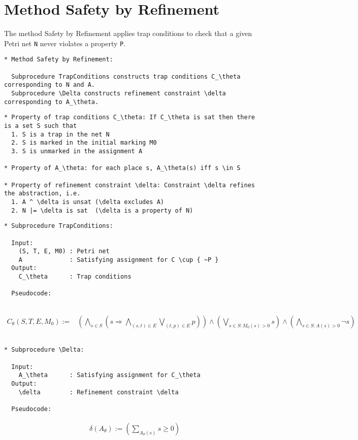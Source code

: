 \documentclass{llncs}
\begin{document}
\newpage

\section{Method Safety by Refinement}

The method Safety by Refinement applies trap conditions to check that a given Petri net \verb=N= never violates a property \verb=P=.

\begin{verbatim}
* Method Safety by Refinement:

  Subprocedure TrapConditions constructs trap conditions C_\theta corresponding to N and A.
  Subprocedure \Delta constructs refinement constraint \delta corresponding to A_\theta.
\end{verbatim}





\begin{verbatim}
* Property of trap conditions C_\theta: If C_\theta is sat then there is a set S such that
  1. S is a trap in the net N
  2. S is marked in the initial marking M0
  3. S is unmarked in the assignment A

* Property of A_\theta: for each place s, A_\theta(s) iff s \in S

* Property of refinement constraint \delta: Constraint \delta refines the abstraction, i.e.
  1. A ^ \delta is unsat (\delta excludes A)
  2. N |= \delta is sat  (\delta is a property of N)
\end{verbatim}

\newpage

\begin{verbatim}
* Subprocedure TrapConditions:

  Input:
    (S, T, E, M0) : Petri net
    A             : Satisfying assignment for C \cup { ~P }
  Output:
    C_\theta      : Trap conditions

  Pseudocode:
  
\end{verbatim}
\begin{align*}
  C_\theta(S, T, E, M_0) :=& \left( \bigwedge_{s \in S} \left( s \Rightarrow
      \bigwedge_{(s, t) \in E} \bigvee_{(t, p) \in E} p
    \right) \right) \land
    \left( \bigvee_{s \in S: M_0(s) > 0} s \right) \land
    \left( \bigwedge_{s \in S: A(s) > 0} \neg s \right)
\end{align*}
\begin{verbatim}

* Subprocedure \Delta:

  Input:
    A_\theta      : Satisfying assignment for C_\theta
  Output:
    \delta        : Refinement constraint \delta

  Pseudocode:

\end{verbatim}
\begin{align*}
  & \delta(A_\theta) := \left( \sum_{A_\theta(s)} s \ge 0 \right)
\end{align*}
\end{document}
